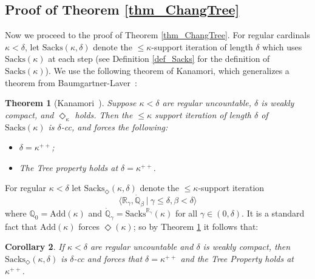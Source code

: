 \documentclass{amsart}
\newtheorem{theorem}{Theorem}
\newtheorem{corollary}[theorem]{Corollary}
\begin{document}
 

\subsection{Proof of Theorem \ref{thm_ChangTree}}

Now we proceed to the proof of Theorem \ref{thm_ChangTree}.  For regular cardinals $\kappa < \delta$, let $\text{Sacks}(\kappa, \delta)$ denote the $\le \kappa$-support iteration of length $\delta$ which uses $\text{Sacks}(\kappa)$ at each step (see Definition \ref{def_Sacks} for the definition of $\text{Sacks}(\kappa)$).  We use the following theorem of Kanamori, which generalizes a theorem from Baumgartner-Laver~\cite{MR556894}: 
\begin{theorem}[Kanamori~\cite{MR593029}]\label{thm_Kanamori}
Suppose $\kappa < \delta$ are regular uncountable, $\delta$ is weakly compact, and $\Diamond_\kappa$ holds.  Then the $\le \kappa$ support iteration of length $\delta$ of $\text{Sacks}(\kappa)$ is $\delta$-cc, and forces the following:
\begin{itemize}
 \item $\delta = \kappa^{++}$;
 \item The Tree property holds at $\delta = \kappa^{++}$.
\end{itemize}
\end{theorem}

For regular $\kappa < \delta$ let $\text{Sacks}_{\Diamond}(\kappa, \delta)$ denote the $\le \kappa$-support iteration 
\[
\langle \mathbb{R}_\gamma, \dot{\mathbb{Q}}_\beta \ | \ \gamma \le \delta, \beta < \delta \rangle
\]
where $\mathbb{Q}_0 = \text{Add}(\kappa)$ and $\dot{\mathbb{Q}}_\gamma = \text{Sacks}^{\mathbb{R}_\gamma}(\kappa)$ for all $\gamma \in (0,\delta)$.  It is a standard fact that $\text{Add}(\kappa)$ forces $\Diamond(\kappa)$; so by Theorem \ref{thm_Kanamori} it follows that:
\begin{corollary}\label{cor_ForcesTP}
If $\kappa < \delta$ are regular uncountable and $\delta$ is weakly compact, then $\text{Sacks}_{\Diamond}(\kappa, \delta)$ is $\delta$-cc and forces that $\delta = \kappa^{++}$ and the Tree Property holds at $\kappa^{++}$.
\end{corollary}
\end{document}
